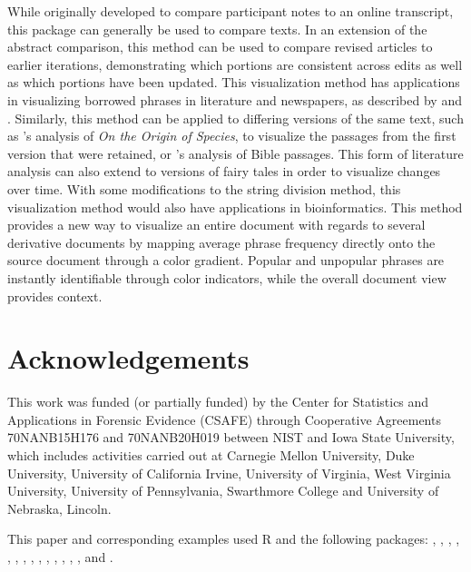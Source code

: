 While originally developed to compare participant notes to an online transcript, this package can generally be used to compare texts.
In an extension of the abstract comparison, this method can be used to compare revised articles to earlier iterations, demonstrating which portions are consistent across edits as well as which portions have been updated.
This visualization method has applications in visualizing borrowed phrases in literature and newspapers, as described by \citet{smith_infectious_2013} and \citet{olsen_something_2011}.
Similarly, this method can be applied to differing versions of the same text, such as \citet{fryTracingOrigin2018}'s analysis of \emph{On the Origin of Species}, to visualize the passages from the first version that were retained, or \citet{janicke_visualizations_2014}'s analysis of Bible passages.
This form of literature analysis can also extend to versions of fairy tales in order to visualize changes over time.
With some modifications to the string division method, this visualization method would also have applications in bioinformatics.
This method provides a new way to visualize an entire document with regards to several derivative documents by mapping average phrase frequency directly onto the source document through a color gradient.
Popular and unpopular phrases are instantly identifiable through color indicators, while the overall document view provides context.

\section{Acknowledgements}\label{acknowledgements}

This work was funded (or partially funded) by the Center for Statistics and Applications in Forensic Evidence (CSAFE) through Cooperative Agreements 70NANB15H176 and 70NANB20H019 between NIST and Iowa State University, which includes activities carried out at Carnegie Mellon University, Duke University, University of California Irvine, University of Virginia, West Virginia University, University of Pennsylvania, Swarthmore College and University of Nebraska, Lincoln.

This paper and corresponding examples used R \citep{base} and the following packages:  \citep{DiagrammeR},  \citep{gt},  \citep{highlightr},  \citep{imager},  \citep{knitr2025},  \citep{pander},  \citep{patchwork},  \citep{plotly},  \citep{purrr},  \citep{rjtools},  \citep{rmarkdown2025},  \citep{rvest},  \citep{stringr},  \citep{tidyverse}, and  \citep{webshot2}.

